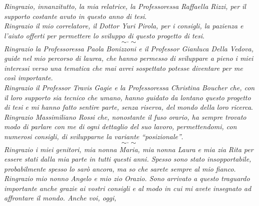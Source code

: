 \chapter*{}
\vspace{-3cm}

\thispagestyle{empty}

\begin{flushleft}
  \textit{Ringrazio, innanzitutto, la mia relatrice, la Professoressa Raffaella
    Rizzi, per il supporto costante avuto in questo anno di tesi}.\\
  \vspace{2mm}
  \textit{Ringrazio il mio correlatore, il Dottor Yuri Pirola, per i consigli,
    la pazienza e l'aiuto offerti per permettere lo sviluppo di questo progetto
    di tesi}.%
  \[\sim\cdot\sim\]
  \textit{Ringrazio la Professoressa Paola Bonizzoni e il Professor Gianluca
    Della Vedova, guide nel mio percorso di laurea, che hanno permesso
    di sviluppare a pieno i miei interessi verso una tematica che mai avrei
    sospettato potesse diventare per me così importante}.\\
  \vspace{2mm}
  \textit{Ringrazio il Professor Travis Gagie e la Professoressa Christina
    Boucher che, con il loro supporto 
    sia tecnico che umano, hanno guidato da lontano questo progetto di tesi e
    mi hanno fatto sentire parte, senza riserva, del mondo della loro
    ricerca}.\\ 
    \vspace{2mm}
    \textit{Ringrazio Massimiliano Rossi che, nonostante il fuso orario,
    ha sempre trovato modo di parlare con me di ogni dettaglio del suo
    lavoro, permettendomi, con numerosi consigli, di svilupparne la variante 
    ``posizionale''}.  
  \[\sim\cdot\sim\]
  \textit{Ringrazio i miei genitori, mia nonna Maria, mia nonna Laura e mia zia
    Rita per essere stati dalla mia parte in tutti questi anni. Spesso sono
    stato insopportabile, probabilmente spesso lo sarò ancora, ma so che sarete
    sempre al mio fianco}.\\
  \vspace{2mm}
  \textit{Ringrazio mio nonno Angelo e mio zio Orazio. Sono
    arrivato a questo traguardo importante anche grazie ai vostri consigli e al
    modo in cui mi avete insegnato ad affrontare il mondo. Anche voi, oggi,
}
\end{flushleft}
